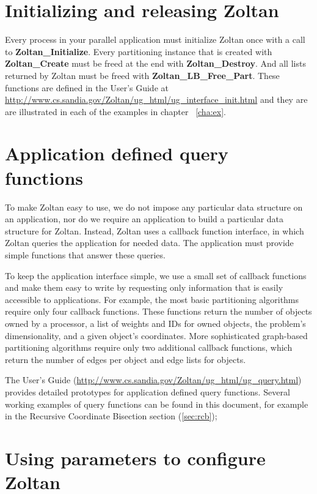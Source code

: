 \section{Initializing and releasing Zoltan}

Every process in your parallel application must initialize Zoltan once
with a call to \textbf{Zoltan\_Initialize}.  Every
partitioning instance that is created with \textbf{Zoltan\_Create} must be freed at
the end with \textbf{Zoltan\_Destroy}.  And all lists returned by
Zoltan must be freed with \textbf{Zoltan\_LB\_Free\_Part}.  These functions
are defined in the User's Guide at
\url{http://www.cs.sandia.gov/Zoltan/ug\_html/ug\_interface\_init.html}
and they are are illustrated in each of the examples in chapter ~\ref{cha:ex}.

\section{Application defined query functions}

To make Zoltan easy to use, we do not impose any particular data structure 
on an application, nor do we require an application to build a particular 
data structure for Zoltan. Instead, Zoltan uses a callback function interface, 
in which Zoltan queries the application for needed data. The application must 
provide simple functions that answer these queries.

To keep the application interface simple, we use a small set of callback functions 
and make them easy to write by requesting only information that is easily accessible 
to applications. For example, the most basic partitioning algorithms require only 
four callback functions. These functions return the number of objects owned by a 
processor, a list of weights and IDs for owned objects, the problem's dimensionality, 
and a given object's coordinates. More sophisticated graph-based partitioning 
algorithms require only two additional callback functions, which return the number 
of edges per object and edge lists for objects.

The User's Guide 
(\url{http://www.cs.sandia.gov/Zoltan/ug\_html/ug\_query.html})
provides detailed prototypes for application defined query functions.
Several working examples of query functions can be found in this document,
for example in the Recursive Coordinate Bisection section (\ref{sec:rcb});

\section{Using parameters to configure Zoltan}

